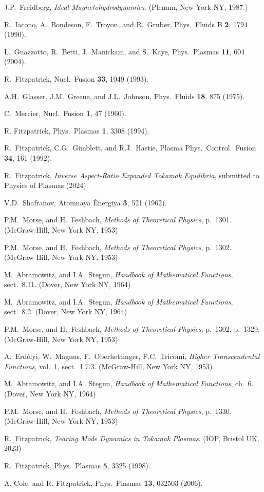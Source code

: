 \documentclass[12pt,prb,aps]{revtex4-1}
\begin{document}
\begin{thebibliography}{99}
 J.P.~Freidberg, {\em Ideal Magnetohydrodynamics}. (Plenum, New York NY, 1987.)

 R.~Iacono, A.~Bondeson, F.~Troyon, and R.~Gruber, Phys.\ Fluids B {\bf 2}, 1794 (1990).

 L.~Guazzotto,  R.~Betti, J.~Manickam, and  S.~Kaye, Phys.\ Plasmas {\bf 11}, 604 (2004).

 R.~Fitzpatrick, Nucl.\ Fusion {\bf 33}, 1049 (1993).

 A.H.~Glasser, J.M.~Greene, and J.L.~Johnson, Phys.\ Fluids {\bf 18}, 875 (1975).

 C.~Mercier, Nucl.\ Fusion {\bf 1}, 47 (1960).

 R. Fitzpatrick, Phys.\ Plasmas {\bf 1}, 3308 (1994).

 R.~Fitzpatrick, C.G.~Gimblett, and R.J.~Hastie, Plasma Phys.\ Control.\ Fusion {\bf 34}, 161 (1992). 

 R.~Fitzpatrick, {\em Inverse Aspect-Ratio Expanded Tokamak Equilibria}, submitted to Physics of Plasmas (2024).

 V.D.~Shafranov, Atomnaya \'{E}nergiya {\bf 3}, 521  (1962).

 P.M.~Morse, and H.~Feshbach, {\em Methods of Theoretical Physics}, p.~1301. (McGraw-Hill, New York NY, 1953)

 P.M.~Morse, and H.~Feshbach, {\em Methods of Theoretical Physics}, p.~1302. (McGraw-Hill, New York NY, 1953)

 M.~Abramowitz, and I.A.~Stegun, {\em Handbook of Mathematical Functions}, sect.~8.11. (Dover, New York NY, 1964)

 M.~Abramowitz, and I.A.~Stegun, {\em Handbook of Mathematical Functions}, sect.~8.2. (Dover, New York NY, 1964)

 P.M.~Morse, and H.~Feshbach, {\em Methods of Theoretical Physics}, p.~1302, p.~1329. (McGraw-Hill, New York NY, 1953)

 A.~Erd\'{e}lyi, W.~Magnus, F.~Oberhettinger, F.C.~Tricomi, {\em Higher Transcendental Functions}, vol.~1, sect.~1.7.3. 
(McGraw-Hill, New York NY, 1953)

 M.~Abramowitz, and I.A.~Stegun, {\em Handbook of Mathematical Functions}, ch.~6. (Dover, New York NY, 1964)

 P.M.~Morse, and H.~Feshbach, {\em Methods of Theoretical Physics}, p.~1330. (McGraw-Hill, New York NY, 1953)

 R.~Fitzpatrick, {\em Tearing Mode Dynamics in Tokamak Plasmas}. (IOP, Bristol UK,  2023)

 R.~Fitzpatrick, Phys.\ Plasmas {\bf 5}, 3325 (1998).

 A. Cole, and R. Fitzpatrick, Phys.\ Plasmas {\bf 13}, 032503 (2006).

\end{thebibliography}
\end{document}
